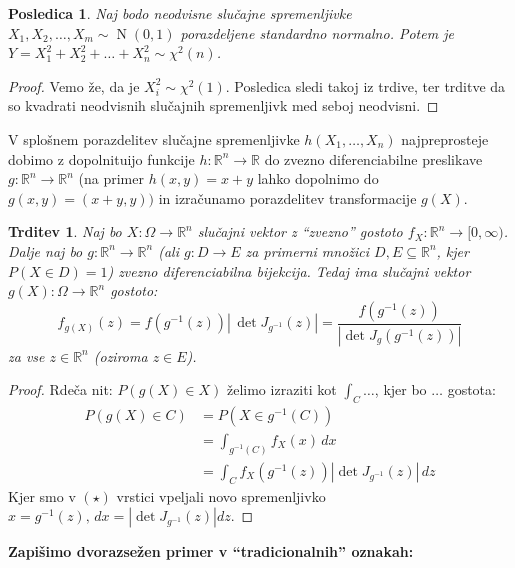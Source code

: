 \documentclass[12pt]{book}
\def\n{\noindent}
\theoremstyle{definition}
\theoremstyle{plain}
\theoremstyle{plain}
\newtheorem{trditev}{Trditev}
\theoremstyle{plain}
\newtheorem{posledica}{Posledica}
\theoremstyle{remark}
\begin{document}
\begin{posledica}
    Naj bodo neodvisne slučajne spremenljivke $X_1, X_2, \ldots, X_m \sim \operatorname{N}(0,1)$ porazdeljene standardno normalno. Potem je $Y=X_1^2+X_2^2+\ldots+X_n^2 \sim \chi^2(n)$.
\end{posledica}

\begin{proof}
    Vemo že, da je $X_i^2 \sim \chi^2(1)$. Posledica sledi takoj iz trdive, ter trditve da so kvadrati neodvisnih slučajnih spremenljivk med seboj neodvisni.
\end{proof}

\n V splošnem porazdelitev slučajne spremenljivke $h\left(X_1, \ldots, X_n\right)$ najpreprosteje dobimo z dopolnituijo funkcije $h: \mathbb{R}^n \rightarrow \mathbb{R}$ do zvezno diferenciabilne preslikave $g: \mathbb{R}^n \rightarrow \mathbb{R}^n$ (na primer $h(x, y)=x+y$ lahko dopolnimo do $g(x, y)=(x+y, y))$ in izračunamo porazdelitev transformacije $g(X)$.

\begin{trditev}
    Naj bo $X: \Omega \to \mathbb{R}^n$ slučajni vektor z “zvezno” gostoto $f_X:\mathbb{R}^n \to [0, \infty)$. Dalje naj bo $g: \mathbb{R}^n \to \mathbb{R}^n$ (ali $g:D \to E$ za primerni množici $D, E \subseteq \mathbb{R}^n$, kjer $P(X \in D)=1$) zvezno diferenciabilna bijekcija. Tedaj ima slučajni vektor $g(X): \Omega \to \mathbb{R}^n$ gostoto: 
    $$
    f_{g(X)}(z)=f\left(g^{-1}(z)\right) \left\lvert\, \det J_{g^{-1}}(z) \right\rvert =\frac{f\left(g^{-1}(z)\right)}{\left|\det J_g\left(g^{-1}(z)\right)\right|}
    $$
    za vse $z \in \mathbb{R}^n$ (oziroma $z \in E$).
\end{trditev}

\begin{proof}
    Rdeča nit: $P(g(X) \in X)$ želimo izraziti kot $\int_C \ldots$, kjer bo $\ldots$ gostota:
    \begin{align*}
        P(g(X) \in C)&=P\left(X \in g^{-1}(C)\right) \\
        &=\int_{g^{-1}(C)} f_X(x) \, d x \tag{$\star$}\\ 
        &=\int_C f_X\left(g^{-1}(z)\right)\left|\det J_{g^{-1}}(z)\right| \, d z    
    \end{align*} 
    Kjer smo v $(\star)$ vrstici vpeljali novo spremenljivko $x=g^{-1}(z), \, d x=| \det J_{g^{-1}}(z) | d z$.
\end{proof}

\n \textbf{Zapišimo dvorazsežen primer v “tradicionalnih” oznakah:}
\end{document}
